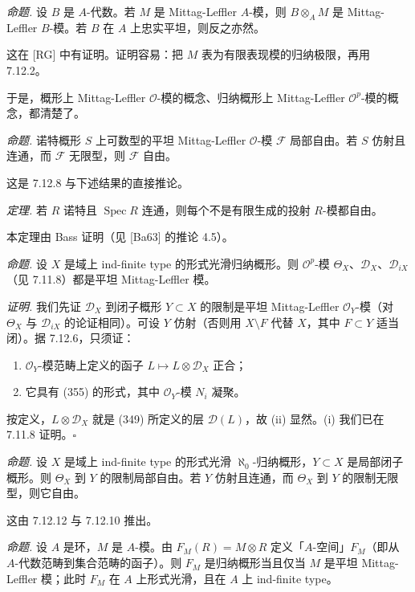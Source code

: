  \emph{命题.} 设 $B$ 是 $A$-代数。若 $M$ 是 Mittag-Leffler $A$-模，则 $B\otimes_A M$ 是 Mittag-Leffler $B$-模。若 $B$ 在 $A$ 上忠实平坦，则反之亦然。

这在 [RG] 中有证明。证明容易：把 $M$ 表为有限表现模的归纳极限，再用 7.12.2。

于是，概形上 Mittag-Leffler $\mathcal{O}$-模的概念、归纳概形上 Mittag-Leffler $\mathcal{O}^p$-模的概念，都清楚了。

 \emph{命题.} 诺特概形 $S$ 上可数型的平坦 Mittag-Leffler $\mathcal{O}$-模 $\mathcal{F}$ 局部自由。若 $S$ 仿射且连通，而 $\mathcal{F}$ 无限型，则 $\mathcal{F}$ 自由。

这是 7.12.8 与下述结果的直接推论。

 \emph{定理.} 若 $R$ 诺特且 $\operatorname{Spec}R$ 连通，则每个不是有限生成的投射 $R$-模都自由。

本定理由 Bass 证明（见 [Ba63] 的推论 4.5）。


 \emph{命题.} 设 $X$ 是域上 ind-finite type 的形式光滑归纳概形。则 $\mathcal{O}^p$-模 $\Theta_X$、$\mathcal{D}_X$、$\mathcal{D}_{iX}$（见 7.11.8）都是平坦 Mittag-Leffler 模。

\emph{证明.} 我们先证 $\mathcal{D}_X$ 到闭子概形 $Y\subset X$ 的限制是平坦 Mittag-Leffler $\mathcal{O}_Y$-模（对 $\Theta_X$ 与 $\mathcal{D}_{iX}$ 的论证相同）。可设 $Y$ 仿射（否则用 $X\setminus F$ 代替 $X$，其中 $F\subset Y$ 适当闭）。据 7.12.6，只须证：
\begin{enumerate}[label=(\roman*),leftmargin=2.2em]
\item $\mathcal{O}_Y$-模范畴上定义的函子 $L\mapsto L\otimes\mathcal{D}_X$ 正合；
\item 它具有 (355) 的形式，其中 $\mathcal{O}_Y$-模 $N_i$ 凝聚。
\end{enumerate}
按定义，$L\otimes\mathcal{D}_X$ 就是 (349) 所定义的层 $\mathcal{D}(L)$，故 (ii) 显然。(i) 我们已在 7.11.8 证明。\hfill$\square$

 \emph{命题.} 设 $X$ 是域上 ind-finite type 的形式光滑 $\aleph_0$-归纳概形，$Y\subset X$ 是局部闭子概形。则 $\Theta_X$ 到 $Y$ 的限制局部自由。若 $Y$ 仿射且连通，而 $\Theta_X$ 到 $Y$ 的限制无限型，则它自由。

这由 7.12.12 与 7.12.10 推出。

 \emph{命题.} 设 $A$ 是环，$M$ 是 $A$-模。由 $F_M(R)=M\otimes R$ 定义「$A$-空间」$F_M$（即从 $A$-代数范畴到集合范畴的函子）。则 $F_M$ 是归纳概形当且仅当 $M$ 是平坦 Mittag-Leffler 模；此时 $F_M$ 在 $A$ 上形式光滑，且在 $A$ 上 ind-finite type。

